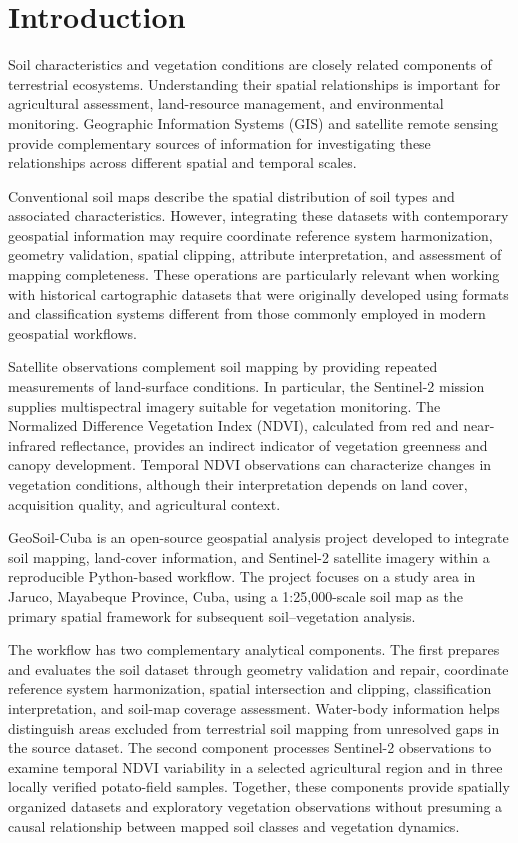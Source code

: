 
\section{Introduction}
\label{sec:introduction}

Soil characteristics and vegetation conditions are closely related
components of terrestrial ecosystems. Understanding their spatial
relationships is important for agricultural assessment, land-resource
management, and environmental monitoring. Geographic Information
Systems (GIS) and satellite remote sensing provide complementary
sources of information for investigating these relationships across
different spatial and temporal scales.

Conventional soil maps describe the spatial distribution of soil
types and associated characteristics. However, integrating these
datasets with contemporary geospatial information may require
coordinate reference system harmonization, geometry validation,
spatial clipping, attribute interpretation, and assessment of
mapping completeness. These operations are particularly relevant
when working with historical cartographic datasets that were
originally developed using formats and classification systems
different from those commonly employed in modern geospatial
workflows.

Satellite observations complement soil mapping by providing
repeated measurements of land-surface conditions. In particular,
the Sentinel-2 mission supplies multispectral imagery suitable
for vegetation monitoring. The Normalized Difference Vegetation
Index (NDVI), calculated from red and near-infrared reflectance,
provides an indirect indicator of vegetation greenness and canopy
development. Temporal NDVI observations can characterize changes
in vegetation conditions, although their interpretation depends
on land cover, acquisition quality, and agricultural context.

GeoSoil-Cuba is an open-source geospatial analysis project
developed to integrate soil mapping, land-cover information,
and Sentinel-2 satellite imagery within a reproducible
Python-based workflow. The project focuses on a study area
in Jaruco, Mayabeque Province, Cuba, using a 1:25,000-scale
soil map as the primary spatial framework for subsequent
soil--vegetation analysis.

The workflow has two complementary analytical components. The
first prepares and evaluates the soil dataset through geometry
validation and repair, coordinate reference system harmonization,
spatial intersection and clipping, classification interpretation,
and soil-map coverage assessment. Water-body information helps
distinguish areas excluded from terrestrial soil mapping from
unresolved gaps in the source dataset. The second component
processes Sentinel-2 observations to examine temporal NDVI
variability in a selected agricultural region and in three
locally verified potato-field samples. Together, these components
provide spatially organized datasets and exploratory vegetation
observations without presuming a causal relationship between
mapped soil classes and vegetation dynamics.

